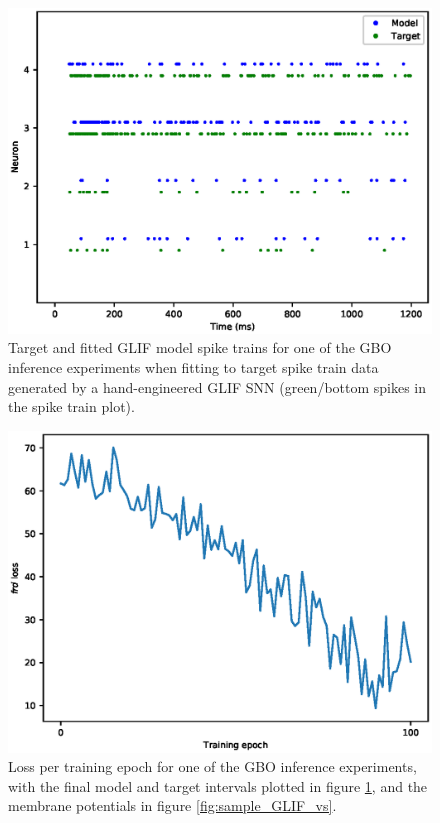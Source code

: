 \documentclass[mphil,deptreport,ianc]{infthesis} %
\begin{document}
\begin{figure}
    \centering
    \vskip -0.1in
    \includegraphics[width=\columnwidth]{figures/samples/SameModelClassTarget/export_spike_trains_euid_12-10_09-45-02-423.eps}
    \vskip -0.1in
    \caption{Target and fitted GLIF model spike trains for one of the GBO inference experiments when fitting to target spike train data generated by a hand-engineered GLIF SNN (green/bottom spikes in the spike train plot).}
    \label{fig:sample_GLIF_spikes}
\end{figure}

\begin{figure}
    \centering
    \vskip -0.1in
    \includegraphics[width=\columnwidth]{figures/samples/SameModelClassTarget/export_GLIF_plot_loss_euid_12-09_16-17-13-464.eps}
    \vskip -0.1in
    \caption{Loss per training epoch for one of the GBO inference experiments, with the final model and target intervals plotted in figure \ref{fig:sample_GLIF_spikes}, and the membrane potentials in figure \ref{fig:sample_GLIF_vs}.}
    \label{fig:sample_GLIF_loss}
\end{figure}
    
\end{document}
